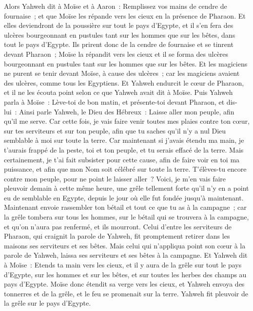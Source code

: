 \begin{multicols}{2}
Alors Yahweh dit à Moïse et à Aaron~: Remplissez vos mains de cendre de fournaise~; et que Moïse les répande vers les cieux en la présence de Pharaon.
Et elles deviendront de la poussière sur tout le pays d'Egypte, et il s'en fera des ulcères bourgeonnant en pustules tant sur les hommes que sur les bêtes, dans tout le pays d'Egypte.
Ils prirent donc de la cendre de fournaise et se tinrent devant Pharaon~; Moïse la répandit vers les cieux et il se forma des ulcères bourgeonnant en pustules tant sur les hommes que sur les bêtes.
 Et les magiciens ne purent se tenir devant Moïse, à cause des ulcères~; car les magiciens avaient des ulcères, comme tous les Egyptiens.
 Et Yahweh endurcit le cœur de Pharaon, et il ne les écouta point selon ce que Yahweh avait dit à Moïse.
Puis Yahweh parla à Moïse~: Lève-toi de bon matin, et présente-toi devant Pharaon, et dis-lui~: Ainsi parle Yahweh, le Dieu des Hébreux~: Laisse aller mon peuple, afin qu'il me serve.
Car cette fois, je vais faire venir toutes mes plaies contre ton cœur, sur tes serviteurs et sur ton peuple, afin que tu saches qu'il n'y a nul Dieu semblable à moi sur toute la terre.
Car maintenant si j'avais étendu ma main, je t'aurais frappé de la peste, toi et ton peuple, et tu serais effacé de la terre.
Mais certainement, je t'ai fait subsister pour cette cause, afin de faire voir en toi ma puissance, et afin que mon Nom soit célébré sur toute la terre.
T'élèves-tu encore contre mon peuple, pour ne point le laisser aller~?
Voici, je m'en vais faire pleuvoir demain à cette même heure, une grêle tellement forte qu'il n'y en a point eu de semblable en Egypte, depuis le jour où elle fut fondée jusqu'à maintenant.
Maintenant envoie rassembler ton bétail et tout ce que tu as à la campagne~; car la grêle tombera sur tous les hommes, sur le bétail qui se trouvera à la campagne, et qu'on n'aura pas renfermé, et ils mourront.
Celui d'entre les serviteurs de Pharaon, qui craignit la parole de Yahweh, fit promptement retirer dans les maisons ses serviteurs et ses bêtes.
Mais celui qui n'appliqua point son cœur à la parole de Yahweh, laissa ses serviteurs et ses bêtes à la campagne.
Et Yahweh dit à Moïse~: Etends ta main vers les cieux, et il y aura de la grêle sur tout le pays d'Egypte, sur les hommes et sur les bêtes, et sur toutes les herbes des champs au pays d'Egypte.
Moïse donc étendit sa verge vers les cieux, et Yahweh envoya des tonnerres et de la grêle, et le feu se promenait sur la terre. Yahweh fit pleuvoir de la grêle sur le pays d'Egypte.

\end{multicols}
